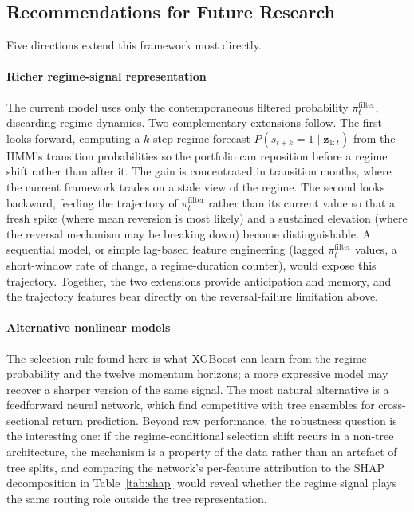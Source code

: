 \subsection{Recommendations for Future Research}\label{sec:future_work}

Five directions extend this framework most directly.

\paragraph{Richer regime-signal representation}
The current model uses only the contemporaneous filtered probability $\pi_t^{\text{filter}}$, discarding regime dynamics. Two complementary extensions follow. The first looks forward, computing a $k$-step regime forecast $P(s_{t+k} = 1 \mid \mathbf{z}_{1:t})$ from the HMM's transition probabilities so the portfolio can reposition before a regime shift rather than after it. The gain is concentrated in transition months, where the current framework trades on a stale view of the regime. The second looks backward, feeding the trajectory of $\pi_t^{\text{filter}}$ rather than its current value so that a fresh spike (where mean reversion is most likely) and a sustained elevation (where the reversal mechanism may be breaking down) become distinguishable. A sequential model, or simple lag-based feature engineering (lagged $\pi_t^{\text{filter}}$ values, a short-window rate of change, a regime-duration counter), would expose this trajectory. Together, the two extensions provide anticipation and memory, and the trajectory features bear directly on the reversal-failure limitation above.

\bigskip\paragraph{Alternative nonlinear models}
The selection rule found here is what XGBoost can learn from the regime probability and the twelve momentum horizons; a more expressive model may recover a sharper version of the same signal. The most natural alternative is a feedforward neural network, which \citet{Gu2020} find competitive with tree ensembles for cross-sectional return prediction. Beyond raw performance, the robustness question is the interesting one: if the regime-conditional selection shift recurs in a non-tree architecture, the mechanism is a property of the data rather than an artefact of tree splits, and comparing the network's per-feature attribution to the SHAP decomposition in Table~\ref{tab:shap} would reveal whether the regime signal plays the same routing role outside the tree representation.

